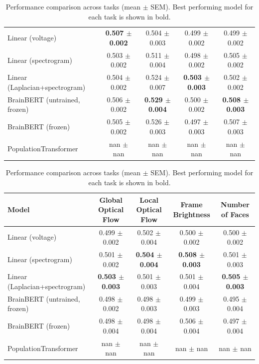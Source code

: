 \begin{table}[h]
\begin{tabular}{lcccc}
\hline
Linear (voltage) & \textbf{0.507 $\pm$ 0.002} & 0.504 $\pm$ 0.003 & 0.499 $\pm$ 0.002 & 0.499 $\pm$ 0.002 \\
Linear (spectrogram) & 0.503 $\pm$ 0.002 & 0.511 $\pm$ 0.004 & 0.498 $\pm$ 0.002 & 0.505 $\pm$ 0.002 \\
Linear (Laplacian+spectrogram) & 0.504 $\pm$ 0.002 & 0.524 $\pm$ 0.007 & \textbf{0.503 $\pm$ 0.003} & 0.502 $\pm$ 0.002 \\
BrainBERT (untrained, frozen) & 0.506 $\pm$ 0.002 & \textbf{0.529 $\pm$ 0.004} & 0.500 $\pm$ 0.002 & \textbf{0.508 $\pm$ 0.003} \\
BrainBERT (frozen) & 0.505 $\pm$ 0.002 & 0.526 $\pm$ 0.003 & 0.497 $\pm$ 0.003 & 0.507 $\pm$ 0.003 \\
PopulationTransformer & nan $\pm$ nan & nan $\pm$ nan & nan $\pm$ nan & nan $\pm$ nan \\
\hline
\end{tabular}
\hspace{1em}
\begin{tabular}{lcccc}
\hline
Model & Global Optical Flow & Local Optical Flow & Frame Brightness & Number of Faces \\
\hline
Linear (voltage) & 0.499 $\pm$ 0.002 & 0.502 $\pm$ 0.004 & 0.500 $\pm$ 0.002 & 0.500 $\pm$ 0.002 \\
Linear (spectrogram) & 0.501 $\pm$ 0.002 & \textbf{0.504 $\pm$ 0.004} & \textbf{0.508 $\pm$ 0.003} & 0.501 $\pm$ 0.003 \\
Linear (Laplacian+spectrogram) & \textbf{0.503 $\pm$ 0.003} & 0.501 $\pm$ 0.003 & 0.501 $\pm$ 0.004 & \textbf{0.505 $\pm$ 0.003} \\
BrainBERT (untrained, frozen) & 0.498 $\pm$ 0.002 & 0.498 $\pm$ 0.003 & 0.499 $\pm$ 0.003 & 0.495 $\pm$ 0.004 \\
BrainBERT (frozen) & 0.498 $\pm$ 0.004 & 0.498 $\pm$ 0.004 & 0.506 $\pm$ 0.004 & 0.497 $\pm$ 0.004 \\
PopulationTransformer & nan $\pm$ nan & nan $\pm$ nan & nan $\pm$ nan & nan $\pm$ nan \\
\hline
\end{tabular}
\caption{Performance comparison across tasks (mean $\pm$ SEM). Best performing model for each task is shown in bold.}
\label{tab:performance_comparison}
\end{table}